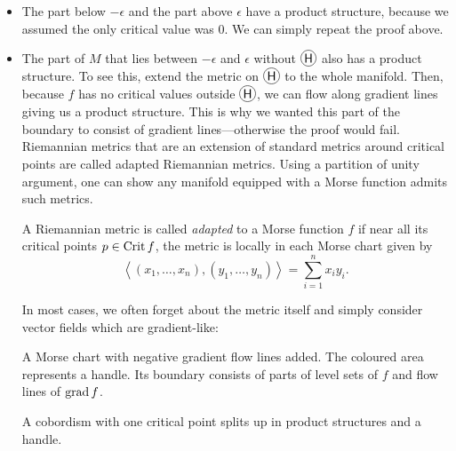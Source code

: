 \begin{itemize}
    \item[\circled{A}] The part below $-\epsilon$ and the part above $\epsilon$ have a product structure, because we assumed the only critical value was $0$.
        We can simply repeat the proof above.
    \item[\circled{B}] The part of $M$ that lies between $-\epsilon$  and $\epsilon$ without $\circled{H}$ also has a product structure.
        To see this, extend the metric on $\circled{H}$ to the whole manifold. Then, because $f$ has no critical values outside $\circled{H}$, we can flow along gradient lines giving us a product structure.
        This is why we wanted this part of the boundary to consist of gradient lines---otherwise the proof would fail.
        Riemannian metrics that are an extension of standard metrics around critical points are called adapted Riemannian metrics.
        Using a partition of unity argument, one can show any manifold equipped with a Morse function admits such metrics.
        \begin{definition}
            A Riemannian  metric is called \emph{adapted} to a Morse function $f$ if near all its critical points $p \in \operatorname{Crit} f$, the metric is locally in each Morse chart given by
            \[
            \left<
            (x_1, \ldots, x_n), 
            (y_1, \ldots, y_n)
            \right> = \sum_{i=1}^{n} x_i y_i
            .\] 
        \end{definition}
        In most cases, we often forget about the metric itself and simply consider vector fields which are gradient-like:

        \begin{marginfigure}[-4cm]
            \centering
            \caption{A Morse chart with negative gradient flow lines added.
            The coloured area represents a handle. Its boundary consists of parts of level sets of $f$ and flow lines of $\operatorname{grad} f$.}
            \label{fig:morse-chart-flow-lines}
        \end{marginfigure}
        \begin{marginfigure}[4cm]
            \centering
            \caption{A cobordism with one critical point splits up in product structures and a handle.}
            \label{fig:morse-chart-zoomed-in}
        \end{marginfigure}


\end{itemize}
